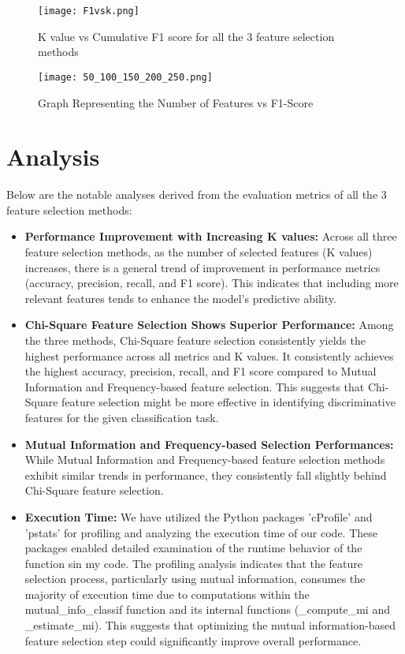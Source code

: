 \documentclass[acmlarge,nonacm,12pt]{acmart}
\begin{document}
\begin{figure}
    \centering
    \texttt{[image: F1vsk.png]}
    \caption{K value vs Cumulative F1 score for all the 3 feature selection methods}
    \label{fig:enter-label}
\end{figure}


\begin{figure}[h]
    \centering
    \texttt{[image: 50\_100\_150\_200\_250.png]}
    \caption{Graph Representing the Number of Features vs F1-Score}
    \label{fig:enter-label}
\end{figure}


\section{Analysis}

Below are the notable analyses derived from the evaluation metrics of all the 3 feature selection methods:

\begin{itemize}
    \item \textbf{Performance Improvement with Increasing K values: }Across all three feature selection methods, as the number of selected features (K values) increases, there is a general trend of improvement in performance metrics (accuracy, precision, recall, and F1 score). This indicates that including more relevant features tends to enhance the model's predictive ability.
    \item \textbf{Chi-Square Feature Selection Shows Superior Performance: }Among the three methods, Chi-Square feature selection consistently yields the highest performance across all metrics and K values. It consistently achieves the highest accuracy, precision, recall, and F1 score compared to Mutual Information and Frequency-based feature selection. This suggests that Chi-Square feature selection might be more effective in identifying discriminative features for the given classification task.
    \item \textbf{Mutual Information and Frequency-based Selection Performances:} While Mutual Information and Frequency-based feature selection methods exhibit similar trends in performance, they consistently fall slightly behind Chi-Square feature selection. 
    \item \textbf{Execution Time:} We have utilized the Python packages 'cProfile' and 'pstats' for profiling and analyzing the execution time of our code. These packages enabled detailed examination of the runtime behavior of the function sin my code. The profiling analysis indicates that the feature selection process, particularly using mutual information, consumes the majority of execution time due to computations within the mutual\_info\_classif function and its internal functions (\_compute\_mi and \_estimate\_mi). This suggests that optimizing the mutual information-based feature selection step could significantly improve overall performance.
\end{itemize}
\end{document}
